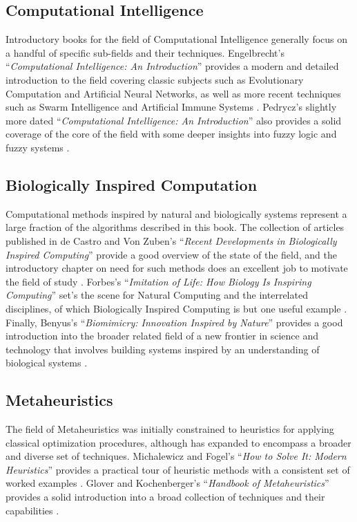 \begin{bibunit}
% 
% 
\subsection{Computational Intelligence}
Introductory books for the field of Computational Intelligence generally focus on a handful of specific sub-fields and their techniques. Engelbrecht's ``\emph{Computational Intelligence: An Introduction}'' provides a modern and detailed introduction to the field covering classic subjects such as Evolutionary Computation and Artificial Neural Networks, as well as more recent techniques such as Swarm Intelligence and Artificial Immune Systems \cite{Engelbrecht2007}. Pedrycz's slightly more dated ``\emph{Computational Intelligence: An Introduction}'' also provides a solid coverage of the core of the field with some deeper insights into fuzzy logic and fuzzy systems \cite{Pedrycz1997}.

% 
% 
\subsection{Biologically Inspired Computation}
Computational methods inspired by natural and biologically systems represent a large fraction of the algorithms described in this book. The collection of articles published in de Castro and Von Zuben's ``\emph{Recent Developments in Biologically Inspired Computing}'' provide a good overview of the state of the field, and the introductory chapter on need for such methods does an excellent job to motivate the field of study \cite{Castro2005}. Forbes's ``\emph{Imitation of Life: How Biology Is Inspiring Computing}'' set's the scene for Natural Computing and the interrelated disciplines, of which Biologically Inspired Computing is but one useful example \cite{Forbes2000}. Finally, Benyus's ``\emph{Biomimicry: Innovation Inspired by Nature}'' provides a good introduction into the broader related field of a new frontier in science and technology that involves building systems inspired by an understanding of biological systems \cite{Benyus1998}.


% 
% 
\subsection{Metaheuristics}
The field of Metaheuristics was initially constrained to heuristics for applying classical optimization procedures, although has expanded to encompass a broader and diverse set of techniques. Michalewicz and Fogel's ``\emph{How to Solve It: Modern Heuristics}'' provides a practical tour of heuristic methods with a consistent set of worked examples \cite{Michalewicz2004}. Glover and Kochenberger's ``\emph{Handbook of Metaheuristics}'' provides a solid introduction into a broad collection of techniques and their capabilities \cite{Glover2003}.


\end{bibunit}
